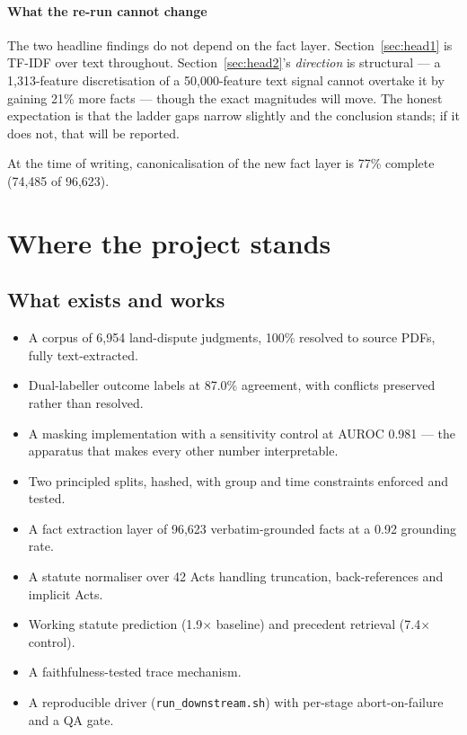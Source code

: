 \documentclass[12pt,a4paper]{article}
\newcommand{\code}[1]{\texttt{\small #1}}
\begin{document}
\paragraph{What the re-run cannot change} The two headline findings do not depend on the fact layer.
Section~\ref{sec:head1} is TF-IDF over text throughout. Section~\ref{sec:head2}'s \emph{direction} is
structural --- a 1,313-feature discretisation of a 50,000-feature text signal cannot overtake it by
gaining 21\% more facts --- though the exact magnitudes will move. The honest expectation is that the
ladder gaps narrow slightly and the conclusion stands; if it does not, that will be reported.

At the time of writing, canonicalisation of the new fact layer is 77\% complete
(74,485 of 96,623).

\section{Where the project stands}\label{sec:standing}

\subsection{What exists and works}

\begin{itemize}
\item A corpus of 6,954 land-dispute judgments, 100\% resolved to source PDFs, fully text-extracted.
\item Dual-labeller outcome labels at 87.0\% agreement, with conflicts preserved rather than resolved.
\item A masking implementation with a sensitivity control at AUROC 0.981 --- the apparatus that makes
every other number interpretable.
\item Two principled splits, hashed, with group and time constraints enforced and tested.
\item A fact extraction layer of 96,623 verbatim-grounded facts at a 0.92 grounding rate.
\item A statute normaliser over 42 Acts handling truncation, back-references and implicit Acts.
\item Working statute prediction (1.9$\times$ baseline) and precedent retrieval (7.4$\times$ control).
\item A faithfulness-tested trace mechanism.
\item A reproducible driver (\code{run\_downstream.sh}) with per-stage abort-on-failure and a QA gate.
\end{itemize}
\end{document}
